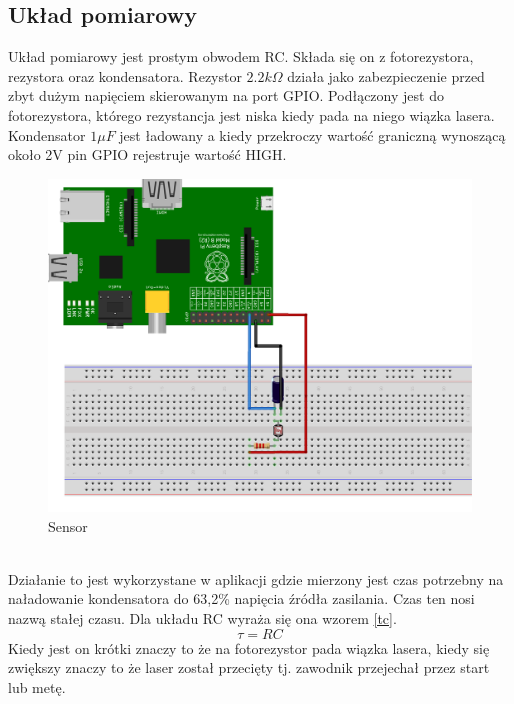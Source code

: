 \documentclass[11pt,a4paper, twoside]{article}
\begin{document}
\subsection{Układ pomiarowy}\label{sensor}
Układ pomiarowy jest prostym obwodem RC. Składa się on z fotorezystora, rezystora oraz kondensatora. Rezystor $2.2k \Omega$ działa jako zabezpieczenie przed zbyt dużym napięciem skierowanym na port GPIO. Podłączony jest do fotorezystora, którego rezystancja jest niska kiedy pada na niego wiązka lasera. Kondensator $1\mu F$ jest ładowany a kiedy przekroczy wartość graniczną wynoszącą około 2V pin GPIO rejestruje wartość HIGH.
\begin{figure}[h]
\begin{center}
\includegraphics[scale=0.15]{./img/sensor_bb.png}
\caption{Sensor}
\end{center}
\end{figure}
\\
Działanie to jest wykorzystane w aplikacji gdzie mierzony jest czas potrzebny na naładowanie kondensatora do 63,2\% napięcia źródła zasilania. Czas ten nosi nazwą stałej czasu. Dla układu RC wyraża się ona wzorem \ref{tc}. 
\begin{equation}\label{tc}
	\tau = RC
\end{equation}
Kiedy jest on krótki znaczy to że na fotorezystor pada wiązka lasera, kiedy się zwiększy znaczy to że laser został przecięty tj. zawodnik przejechał przez start lub metę. 
\newpage
\end{document}
